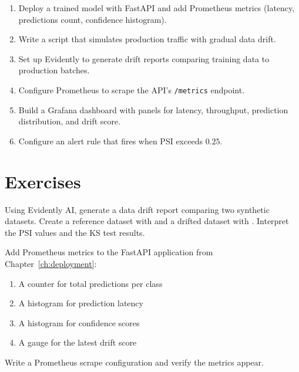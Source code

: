 \begin{miniproject}[title=\textbf{Mini-project 10: Model monitoring}]
\begin{enumerate}
  \item Deploy a trained model with FastAPI and add Prometheus metrics
    (latency, predictions count, confidence histogram).
  \item Write a script that simulates production traffic with
    gradual data drift.
  \item Set up Evidently to generate drift reports comparing
    training data to production batches.
  \item Configure Prometheus to scrape the API's \texttt{/metrics}
    endpoint.
  \item Build a Grafana dashboard with panels for latency, throughput,
    prediction distribution, and drift score.
  \item Configure an alert rule that fires when PSI exceeds $0.25$.
\end{enumerate}
\end{miniproject}

\section{Exercises}
\label{sec:exercises-ch10}

\begin{exercise}
Using Evidently AI, generate a data drift report comparing two
synthetic datasets. Create a reference dataset with
 and a drifted dataset with
. Interpret the PSI values and
the KS test results.
\end{exercise}

\begin{exercise}
Add Prometheus metrics to the FastAPI application from
Chapter~\ref{ch:deployment}:
\begin{enumerate}
  \item A counter for total predictions per class
  \item A histogram for prediction latency
  \item A histogram for confidence scores
  \item A gauge for the latest drift score
\end{enumerate}
Write a Prometheus scrape configuration and verify the metrics appear.
\end{exercise}

